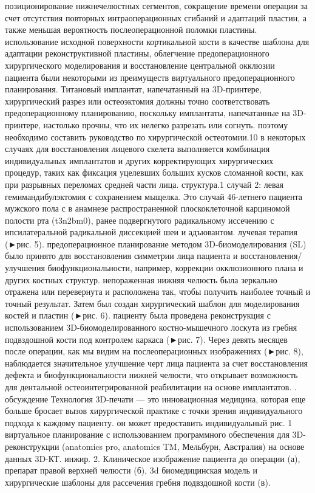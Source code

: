 позиционирование нижнечелюстных сегментов, сокращение времени операции за счет
отсутствия повторных интраоперационных сгибаний и адаптаций пластин, а также
меньшая вероятность послеоперационной поломки пластины. использование исходной
поверхности кортикальной кости в качестве шаблона для адаптации реконструктивной
пластины, облегчение предоперационного хирургического моделирования и
восстановление центральной окклюзии пациента были некоторыми из преимуществ
виртуального предоперационного планирования. Титановый имплантат, напечатанный
на 3D-принтере, хирургический разрез или остеоэктомия должны точно
соответствовать предоперационному планированию, поскольку имплантаты,
напечатанные на 3D-принтере, настолько прочны, что их нелегко разрезать или
согнуть. поэтому необходимо составить руководство по хирургической остеотомии.10
в некоторых случаях для восстановления лицевого скелета выполняется комбинация
индивидуальных имплантатов и других корректирующих хирургических процедур, таких
как фиксация уцелевших больших кусков сломанной кости, как при разрывных
переломах средней части лица. структура.1 случай 2: левая гемимандибулэктомия с
сохранением мыщелка. Это случай 46-летнего пациента мужского пола с в анамнезе
распространенной плоскоклеточной карциномой полости рта (t3n2bm0), ранее
подвергнутого радикальному иссечению с ипсилатеральной радикальной диссекцией
шеи и адъювантом. лучевая терапия (►рис. 5). предоперационное планирование
методом 3D-биомоделирования (SL) было принято для восстановления симметрии лица
пациента и восстановления/улучшения биофункциональности, например, коррекции
окклюзионного плана и других костных структур. непораженная нижняя челюсть была
зеркально отражена или перевернута и расположена так, чтобы получить наиболее
точный и точный результат. Затем был создан хирургический шаблон для
моделирования костей и пластин (►рис. 6). пациенту была проведена реконструкция
с использованием 3D-биомоделированного костно-мышечного лоскута из гребня
подвздошной кости под контролем каркаса (►рис. 7). Через девять месяцев после
операции, как мы видим на послеоперационных изображениях (►рис. 8), наблюдается
значительное улучшение черт лица пациента за счет восстановления дефекта и
биофункциональности нижней челюсти, что открывает возможность для дентальной
остеоинтегрированной реабилитации на основе имплантатов. . обсуждение Технология
3D-печати — это инновационная медицина, которая еще больше бросает вызов
хирургической практике с точки зрения индивидуального подхода к каждому
пациенту. он может предоставить индивидуальный рис. 1 виртуальное планирование с
использованием программного обеспечения для 3D-реконструкции (anatomics pro,
anatomics TM, Мельбурн, Австралия) на основе данных 3D-КТ. инжир. 2. Клиническое
изображение пациента до операции (а), препарат правой верхней челюсти (б), 3d
биомедицинская модель и хирургические шаблоны для рассечения гребня подвздошной
кости (в).

